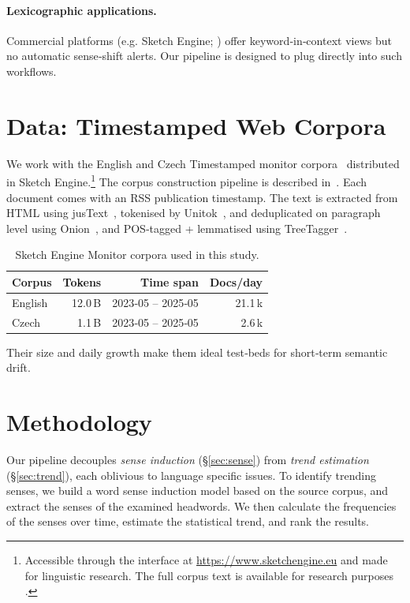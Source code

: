 \documentclass[11pt]{article}
\begin{document}
\paragraph{Lexicographic applications.}
Commercial platforms (e.g. Sketch Engine; \citealp{kilgarriff2014sketch})
offer keyword‑in‑context views but no automatic sense‑shift alerts.
Our pipeline is designed to plug directly into such workflows.



\section{Data: Timestamped Web Corpora}
\label{sec:data}

We work with the English and Czech
Timestamped monitor corpora~\citep{trendcorpora2025} distributed in Sketch Engine.\footnote{Accessible through the interface at \url{https://www.sketchengine.eu} and made for linguistic research. The full corpus text is available for research purposes .} The corpus construction pipeline is described in~\citet{krek2017jsinewsfeed}.
Each document comes with an RSS publication timestamp.
The text is extracted from HTML using jusText~\citep{pomikalek2011removing}, tokenised by Unitok~\citep{michelfeit2014text}, and deduplicated on paragraph level using Onion~\citep{pomikalek2011removing}, and POS‑tagged + lemmatised using TreeTagger~\citep{schmid2013probabilistic}.

\begin{table}[t]
\centering
\small
\begin{tabular}{lrrr}
\toprule
Corpus & Tokens & Time span & Docs/day \\
\midrule
English & 12.0\,B & 2023‑05 – 2025‑05 & 21.1\,k \\
Czech & 1.1\,B & 2023‑05 – 2025‑05 & 2.6\,k \\
\bottomrule
\end{tabular}
\caption{Sketch Engine Monitor corpora used in this study.}
\end{table}

Their size and daily growth make them ideal test‑beds
for short‑term semantic drift.


\section{Methodology}
\label{sec:method}
Our pipeline decouples \emph{sense induction} (§\ref{sec:sense})
from \emph{trend estimation} (§\ref{sec:trend}),
each oblivious to language specific issues.
To identify trending senses, we build a word sense induction model based on the source corpus, and extract the senses of the examined headwords. We then calculate the frequencies of the senses over time, estimate the statistical trend, and rank the results.
\end{document}
